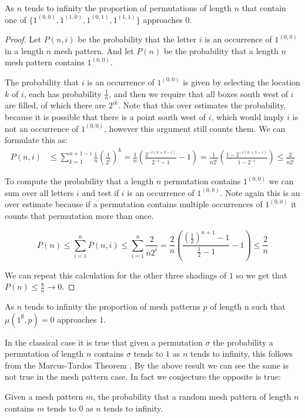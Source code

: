 \documentclass[11pt,a4paper,oneside]{article}
\begin{document}
\begin{lem}
As $n$ tends to infinity the proportion of permutations of length $n$ that contain one of
$\{1^{(0,0)},1^{(1,0)},1^{(0,1)},1^{(1,1)}\}$ approaches $0$.
\begin{proof}
Let $P(n,i)$ be the probability that the letter $i$ is an occurrence of
$1^{(0,0)}$ in a length $n$ mesh pattern. And let $P(n)$ be the probability
that a length $n$ mesh pattern contains $1^{(0,0)}$.

The probability that $i$ is an occurrence of $1^{(0,0)}$ is given by selecting
the location $k$ of $i$, each has probability $\frac{1}{n}$, and then we require
that all boxes south west of $i$ are filled, of which there are $2^{ik}$. Note
that this over estimates the probability, because it is possible that there is a
point south west of $i$, which would imply $i$ is not an occurrence of
$1^{(0,0)}$, however this argument still counts them. We can formulate this as:
\begin{align*}
P(n,i)&\le\sum_{k=1}^{n+1-i}\frac{1}{n}\left(\frac{1}{2^i}\right)^k
=\frac{1}{n}\left(\frac{2^{-i(n+2-i)}}{2^{-i}-1}-1\right)
=\frac{1}{n2^i}\left(\frac{1-2^{-i(n+1-i)}}{1-2^{-i}}\right)
\le\frac{2}{n2^i}
\end{align*}

To compute the probability that a length $n$ permutation contains $1^{(0,0)}$ we
can sum over all letters $i$ and test if $i$ is an occurrence of $1^{(0,0)}$.
Note again this is an over estimate because if a permutation contains multiple
occurrences of $1^{(0,0)}$ it counts that permutation more than once.

$$
P(n)\le\sum_{i=1}^{n}P(n,i)\le\sum_{i=1}^{n}\frac{2}{n2^i}
=\frac{2}{n}\left(\frac{\left(\frac{1}{2}\right)^{n+1}-1}{\frac{1}{2}-1}-1\right)
\le\frac{2}{n}
$$

We can repeat this calculation for the other three shadings of $1$ so we get
that $P(n)\le \frac{8}{n}\rightarrow 0$.
\end{proof}
\end{lem}
\begin{cor}
As $n$ tends to infinity the proportion of mesh patterns $p$ of length n such
that $\mu(1^\emptyset,p)=0$ approaches $1$.
\end{cor}


In the classical case it is true that given a permutation $\sigma$ the
probability a permutation of length $n$ contains $\sigma$ tends to $1$ as $n$
tends to infinity, this follows from the Marcus-Tardos Theorem \cite{MT04}. By
the above result we can see the same is not true in the mesh pattern case. In
fact we conjecture the opposite is true:
\begin{conj}
Given a mesh pattern $m$, the probability that a random mesh pattern of length
$n$ contains $m$ tends to $0$ as $n$ tends to infinity.
\end{conj}
\end{document}
